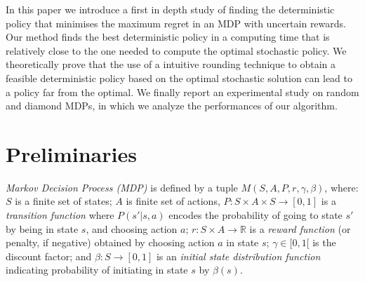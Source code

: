\documentclass[runningheads,a4paper]{llncs}
\begin{document}
In this paper we introduce a first in depth study of finding the deterministic policy that minimises the maximum regret in an MDP with uncertain rewards. Our method finds the best deterministic policy in a computing time that is relatively close to the one needed to compute the optimal stochastic policy. 
We theoretically prove that the use of a intuitive rounding technique to obtain a feasible deterministic policy based on the optimal stochastic solution can lead to a policy far from the optimal. 
We finally report an experimental study on random and diamond MDPs, in which we analyze the performances of our algorithm. 








\section{Preliminaries}\label{sec:Preliminaries}
\textit{Markov Decision Process (MDP)} \citep{Puterman1994} is defined by a tuple $M(S, A, P, r, \gamma, \beta)$, where: $S$ is a finite set of states; $A$ is finite set of actions, $P: S \times A \times S \longrightarrow [0,1]$ is a \textit{transition function} where $P(s'|s,a)$ encodes the probability of going to state $s'$ by being in state $s$, and choosing action $a$; $r: S \times A \longrightarrow \mathbb{R}$ is a \textit{reward function} (or penalty, if negative) obtained by choosing action $a$ in state $s$; $\gamma \in [0, 1[$ is the discount factor; and $\beta: S \longrightarrow [0,1]$ is an \textit{initial state distribution function} indicating probability of initiating in state $s$ by $\beta(s)$.
\end{document}
